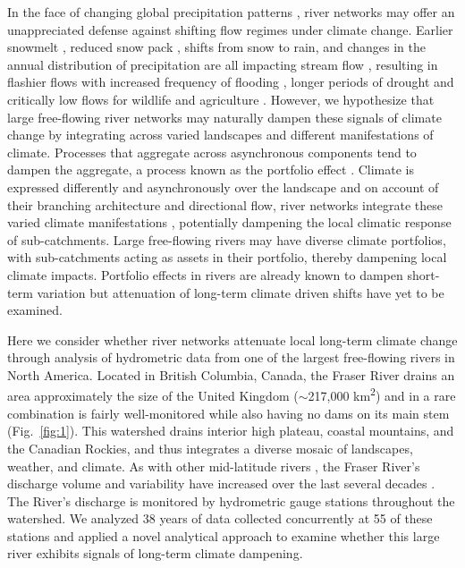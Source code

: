\documentclass[9pt,twocolumn,twoside,lineno]{pnas-new}
\begin{document}
In the face of changing global precipitation patterns \cite{Donat:2016}, river networks may offer an unappreciated defense against shifting flow regimes under climate change\cite{Hartmann:2013,Palmer:2009}. Earlier snowmelt \cite{Rauscher:2008}, reduced snow pack \cite{McCabe:2014}, shifts from snow to rain, and changes in the annual distribution of precipitation are all impacting stream flow \cite{Hartmann:2013}, resulting in flashier flows with increased frequency of flooding \cite{Hirabayashi:2013}, longer periods of drought and critically low flows for wildlife and agriculture \cite{Melillo:2014}. However, we hypothesize that large free-flowing river networks may naturally dampen these signals of climate change by integrating across varied landscapes and different manifestations of climate. Processes that aggregate across asynchronous components tend to dampen the aggregate, a process known as the portfolio effect \cite{Doak:1998}. Climate is expressed differently and asynchronously over the landscape \cite{George:2015} and on account of their branching architecture and directional flow, river networks integrate these varied climate manifestations \cite{Peterson:2013}, potentially dampening the local climatic response of sub-catchments. Large free-flowing rivers may have diverse climate portfolios, with sub-catchments acting as assets in their portfolio, thereby dampening local climate impacts. Portfolio effects in rivers are already known to dampen short-term variation \cite{Moore:2015,Yeakel:2014} but attenuation of long-term climate driven shifts have yet to be examined.

Here we consider whether river networks attenuate local long-term climate change through analysis of hydrometric data from one of the largest free-flowing rivers in North America. Located in British Columbia, Canada, the Fraser River drains an area approximately the size of the United Kingdom ($\sim$217,000 km\textsuperscript{2}) and in a rare combination is fairly well-monitored while also having no dams on its main stem \cite{Vorosmarty:2010} (Fig.~\ref{fig:1}). This watershed drains interior high plateau, coastal mountains, and the Canadian Rockies, and thus integrates a diverse mosaic of landscapes, weather, and climate. As with other mid-latitude rivers \cite{Bindoff:2013}, the Fraser River's discharge volume and variability have increased over the last several decades \cite{Dery:2012,Morrison:2002}. The River's discharge is monitored by hydrometric gauge stations throughout the watershed. We analyzed 38 years of data collected concurrently at 55 of these stations and applied a novel analytical approach to examine whether this large river exhibits signals of long-term climate dampening.
\end{document}
